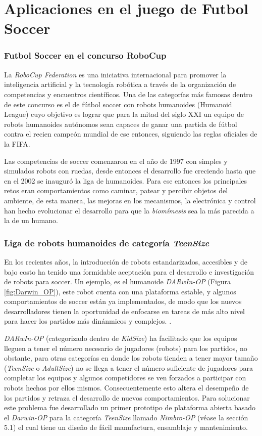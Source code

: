 	\section{Aplicaciones en el juego de Futbol Soccer}	
		\subsubsection*{Futbol Soccer en el concurso RoboCup}
		La \textit{RoboCup Federation} es una iniciativa internacional para promover la inteligencia artificial y la tecnología robótica a través de la organización de competencias y encuentros científicos. Una de las categorías más famosas dentro de este concurso es el de fútbol soccer con robots humanoides (Humanoid League) cuyo objetivo es lograr que para la mitad del siglo XXI un equipo de robots humanoides autónomos sean capaces de ganar una partida de fútbol contra el recien campeón mundial de ese entonces, siguiendo las reglas oficiales de la FIFA.
		
		Las competencias de soccer comenzaron en el año de 1997 con simples y simulados robots con ruedas, desde entonces el desarrollo  fue creciendo hasta que en el 2002 se inauguró la liga de humanoides. Para ese entonces los principales retos eran comportamientos como caminar, patear y percibir objetos del ambiente, de esta manera, las mejoras en los mecanismos, la electrónica y control han hecho evolucionar el desarrollo para que la \textit{biomímesis} sea la más parecida a la de un humano.\citep{gerndt2015humanoid}
		
		\subsubsection*{Liga de robots humanoides de categoría \textit{TeenSize}}
		En los recientes años, la introducción de robots estandarizados, accesibles y de bajo costo ha tenido una formidable aceptación para el desarrollo e investigación de robots para soccer. Un ejemplo, es el humanoide \textit{DARwIn-OP} (Figura \ref{fig:Darwin_OP}), este robot cuenta con una plataforma estable, y algunos comportamientos de soccer están ya implementados, de modo que los nuevos desarrolladores tienen la oportunidad de enfocarse en tareas de más alto nivel para hacer los partidos más dinánmicos y complejos. \citep{schwarz2013humanoid}. 
		
		\textit{DARwIn-OP} (categorizado dentro de \textit{KidSize}) ha facilitado que los equipos lleguen a tener el número necesario de jugadores (robots) para los partidos, no obstante, para otras categorías en donde los robots tienden a tener mayor tamaño (\textit{TeenSize} o \textit{AdultSize}) no se llega a tener el número suficiente de jugadores para completar los equipos y algunos competidores se ven forzados a participar con robots hechos por ellos mismos. Consecuentemente esto altera el desempeño de los partidos y retraza el desarrollo de nuevos comportamientos. Para solucionar este problema fue desarrollado un primer prototipo de plataforma abierta basado el \textit{Darwin-OP} para la categoría \textit{TeenSize} llamado \textit{Nimbro-OP} (véase la sección 5.1) el cual tiene un diseño de fácil manufactura, ensamblaje y mantenimiento.	 

